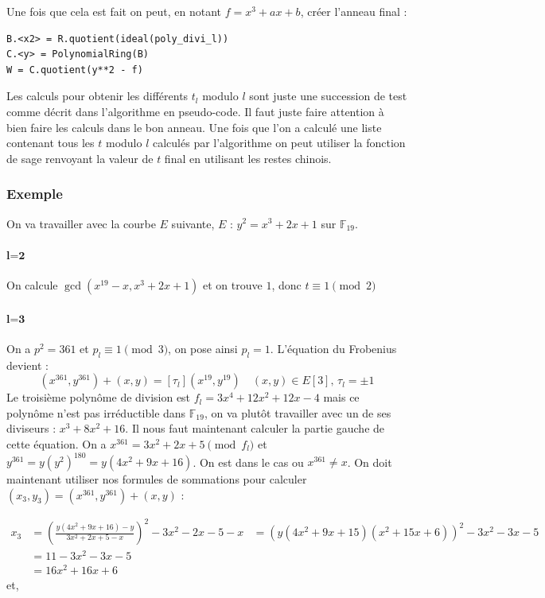 \documentclass{article}
\begin{document}
Une fois que cela est fait on peut, en notant $f=x^3 +ax+b$, créer l'anneau final :
\bigskip
\begin{lstlisting}
B.<x2> = R.quotient(ideal(poly_divi_l))
C.<y> = PolynomialRing(B)
W = C.quotient(y**2 - f)
\end{lstlisting}
\bigskip
Les calculs pour obtenir les différents $t_l$ modulo $l$ sont juste une succession de test comme décrit dans l'algorithme en pseudo-code. Il faut juste faire attention à bien faire les calculs dans le bon anneau.
Une fois que l'on a calculé une liste  contenant tous les $t$ modulo $l$ calculés par l'algorithme on peut utiliser la fonction de sage  renvoyant la valeur de $t$ final en utilisant les restes chinois.
\subsubsection{Exemple}
On va travailler avec la courbe $E$ suivante, $E$ : $y^2 =x^3 +2x+1$ sur $\mathbb{F}_{19}$.

\paragraph{$\textbf{l=2}$}
On calcule $\gcd(x^{19} -x, x^3 + 2x+1)$ et on trouve $1$, donc $t \equiv 1 \pmod 2$

\paragraph{$\textbf{l=3}$}
On a $p^2 = 361$ et $p_l \equiv 1 \pmod 3$, on pose ainsi $p_l = 1$. L'équation du Frobenius devient : 
\begin{equation}
(x^{361}, y^{361}) + (x,y) = [\tau_l](x^{19}, y^{19})  \quad (x,y) \in E[3], \, \tau_l = \pm 1
\end{equation}
Le troisième polynôme de division est $f_l = 3x^4 + 12x^2 +12x - 4$ mais ce polynôme n'est pas irréductible dans $\mathbb{F}_{19}$, on va plutôt travailler avec un de ses diviseurs : $x^3 + 8x^2+16$.
\newline 
Il nous faut maintenant calculer la partie gauche de cette équation.
On a $x^{361} = 3x^2 +2x +5 \pmod f_{l}$ et $y^{361} = y(y^2)^{180} = y(4x^2+9x+16)$. On est dans le cas ou $x^{361} \ne x$. On doit maintenant utiliser nos formules de sommations pour calculer $(x_3, y_3) =(x^{361}, y^{361}) + (x,y)$ : 

\begin{align*}
x_3 &= (\frac{y(4x^2+9x+16) - y}{3x^2 +2x +5 - x})^2 -3x^2 -2x - 5 - x 
 	&= (y(4x^2+9x+15)(x^2+15x+6))^2 -3x^2 -3x - 5 \\
 	&= 11 - 3x^2 -3x - 5  \\
 	&= 16x^2 + 16x + 6 
\end{align*}
et, 
\end{document}
